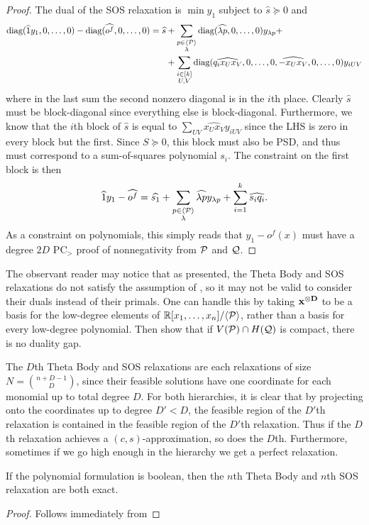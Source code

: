 \begin{proof}
The dual of the SOS relaxation is $\min y_1$ subject to $\hat{s} \succeq 0$ and
\begin{align*}
\text{diag}(\widehat{1}y_1,0,\dots,0) - \text{diag}(\widehat{o^f},0,\dots,0) = \widehat{s} &+ \sum_{\substack{p \in \langle \mathcal P \rangle \\ \lambda}} \text{diag}(\widehat{\lambda p},0,\dots,0) y_{\lambda p} +\\
&+ \sum_{\substack{i \in [k] \\ U,V}} \text{diag}(\widehat{q_ix_Ux_V},0,\dots,0,\widehat{-x_Ux_V},0,\dots,0)y_{iUV}
\end{align*}
where in the last sum the second nonzero diagonal is in the $i$th place. Clearly $\widehat{s}$ must be block-diagonal since everything else is block-diagonal. Furthermore, we know that the $i$th block of $\widehat{s}$ is equal to $\sum_{UV} \widehat{x_Ux_V}y_{iUV}$ since the LHS is zero in every block but the first. Since $S \succeq 0$, this block must also be PSD, and thus must correspond to a sum-of-squares polynomial $s_i$. The constraint on the first block is then 
\[\widehat{1}y_1 - \widehat{o^f} = \widehat{s_1} + \sum_{\substack{p \in \langle \mathcal P \rangle \\ \lambda}} \widehat{\lambda p} y_{\lambda p} + \sum_{i=1}^k \widehat{s_i q_i}.\] 
As a constraint on polynomials, this simply reads that $y_1 - o^f(x)$ must have a degree $2D$ PC$_>$ proof of nonnegativity from $\mathcal P$ and $\mathcal Q$. 
\end{proof}

\begin{remark}
The observant reader may notice that as presented, the Theta Body and SOS relaxations do not satisfy the assumption of , so it may not be valid to consider their duals instead of their primals. One can handle this by taking $\mathbf{x^{\otimes D}}$ to be a basis for the low-degree elements of $\mathbb R[x_1,\dots,x_n]/\langle \mathcal P \rangle$, rather than a basis for every low-degree polynomial. Then \cite{JH16} show that if $V(\mathcal P) \cap H(\mathcal Q)$ is compact, there is no duality gap.
\end{remark}

The $D$th Theta Body and SOS relaxations are each relaxations of size $N = \binom{n+D-1}{D}$, since their feasible solutions have one coordinate for each monomial up to total degree $D$. For both hierarchies, it is clear that by projecting onto the coordinates up to degree $D' < D$, the feasible region of the $D'$th relaxation is contained in the feasible region of the $D'$th relaxation. Thus if the $D$th relaxation achieves a $(c,s)$-approximation, so does the $D$th. Furthermore, sometimes if we go high enough in the hierarchy we get a perfect relaxation.
\begin{lemma}
If the polynomial formulation is boolean, then the $n$th Theta Body and $n$th SOS relaxation are both exact. 
\end{lemma}
\begin{proof}
Follows immediately from 
\end{proof}

